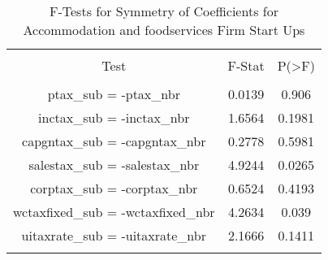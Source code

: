 
\begin{table}[!htbp] \centering 
  \caption{F-Tests for Symmetry of Coefficients for Accommodation and foodservices Firm Start Ups} 
  \label{72Ftests} 
\begin{tabular}{@{\extracolsep{5pt}} ccc} 
\\[-1.8ex]\hline 
\hline \\[-1.8ex] 
Test & F-Stat & P(\textgreater F) \\ 
\hline \\[-1.8ex] 
ptax\_sub = -ptax\_nbr & 0.0139 & 0.906 \\ 
inctax\_sub = -inctax\_nbr & 1.6564 & 0.1981 \\ 
capgntax\_sub = -capgntax\_nbr & 0.2778 & 0.5981 \\ 
salestax\_sub = -salestax\_nbr & 4.9244 & 0.0265 \\ 
corptax\_sub = -corptax\_nbr & 0.6524 & 0.4193 \\ 
wctaxfixed\_sub = -wctaxfixed\_nbr & 4.2634 & 0.039 \\ 
uitaxrate\_sub = -uitaxrate\_nbr & 2.1666 & 0.1411 \\ 
\hline \\[-1.8ex] 
\end{tabular} 
\end{table} 

